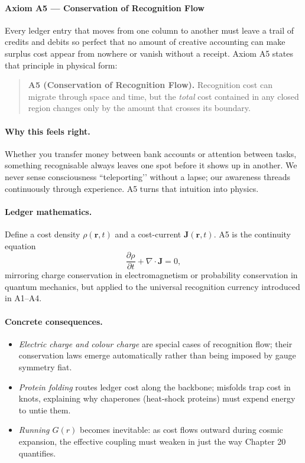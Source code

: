 \documentclass[11pt,oneside]{book}
\begin{document}
\bigskip

\paragraph{Axiom A5 — Conservation of Recognition Flow}
\label{ssec:axiom-A5}

Every ledger entry that moves from one column to another must leave a
trail of credits and debits so perfect that no amount of creative
accounting can make surplus cost appear from nowhere or vanish without a
receipt.  Axiom A5 states that principle in physical form:

\begin{quote}
\textbf{A5 (Conservation of Recognition Flow).}  
Recognition cost can migrate through space and time, but the
\emph{total} cost contained in any closed region changes only by the
amount that crosses its boundary.
\end{quote}

\paragraph*{Why this feels right.}
Whether you transfer money between bank accounts or attention between
tasks, something recognisable always leaves one spot before it shows up
in another.  We never sense consciousness “teleporting’’ without a lapse;
our awareness threads continuously through experience.  A5 turns that
intuition into physics.

\paragraph*{Ledger mathematics.}
Define a cost density \(\rho(\mathbf{r},t)\) and a cost-current
\(\mathbf{J}(\mathbf{r},t)\).  
A5 is the continuity equation
\[
  \frac{\partial \rho}{\partial t}
  + \nabla\!\cdot\!\mathbf{J}
  = 0,
\]
mirroring charge conservation in electromagnetism or probability
conservation in quantum mechanics, but applied to the universal
recognition currency introduced in A1–A4.

\paragraph*{Concrete consequences.}
\begin{itemize}
\item \emph{Electric charge and colour charge} are special cases of
  recognition flow; their conservation laws emerge automatically rather
  than being imposed by gauge symmetry fiat.
\item \emph{Protein folding} routes ledger cost along the backbone;
  misfolds trap cost in knots, explaining why chaperones (heat-shock
  proteins) must expend energy to untie them.
\item \emph{Running \(G(r)\)} becomes inevitable: as cost flows outward
  during cosmic expansion, the effective coupling must weaken in just
  the way Chapter 20 quantifies.
\end{itemize}
\end{document}
